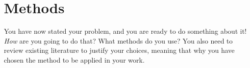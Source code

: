 \documentclass[12pt,a4paper,oneside,pdftex]{report}
\begin{document}
% 

\chapter{Methods}
\label{chapter:methods}

You have now stated your problem, and you are ready to do something
about it!  \emph{How} are you going to do that? What methods do you
use?  You also need to review existing literature to justify your
choices, meaning that why you have chosen the method to be applied in
your work.

\end{document}
